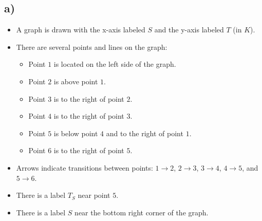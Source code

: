 

\subsection*{a)}

\begin{itemize}
    \item A graph is drawn with the x-axis labeled $S$ and the y-axis labeled $T$ (in $K$).
    \item There are several points and lines on the graph:
    \begin{itemize}
        \item Point $1$ is located on the left side of the graph.
        \item Point $2$ is above point $1$.
        \item Point $3$ is to the right of point $2$.
        \item Point $4$ is to the right of point $3$.
        \item Point $5$ is below point $4$ and to the right of point $1$.
        \item Point $6$ is to the right of point $5$.
    \end{itemize}
    \item Arrows indicate transitions between points: $1 \rightarrow 2$, $2 \rightarrow 3$, $3 \rightarrow 4$, $4 \rightarrow 5$, and $5 \rightarrow 6$.
    \item There is a label $T_S$ near point $5$.
    \item There is a label $S$ near the bottom right corner of the graph.
\end{itemize}